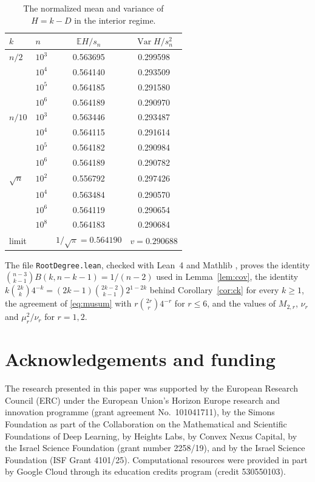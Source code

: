 \documentclass[11pt]{amsart}
\theoremstyle{remark}
\numberwithin{equation}{section}
\newcommand{\E}{\mathbb E}
\newcommand{\1}{\mathbf 1}
\newcommand{\Var}{\operatorname{Var}}
\begin{document}
\begin{table}[ht]
\centering
\begin{tabular}{llcc}
\toprule
$k$ & $n$ & $\E H/s_n$ & $\Var H/s_n^2$\\
\midrule
$n/2$ & $10^3$ & 0.563695 & 0.299598\\
 & $10^4$ & 0.564140 & 0.293509\\
 & $10^5$ & 0.564185 & 0.291580\\
 & $10^6$ & 0.564189 & 0.290970\\
\midrule
$n/10$ & $10^3$ & 0.563446 & 0.293487\\
 & $10^4$ & 0.564115 & 0.291614\\
 & $10^5$ & 0.564182 & 0.290984\\
 & $10^6$ & 0.564189 & 0.290782\\
\midrule
$\sqrt n$ & $10^2$ & 0.556792 & 0.297426\\
 & $10^4$ & 0.563484 & 0.290570\\
 & $10^6$ & 0.564119 & 0.290654\\
 & $10^8$ & 0.564183 & 0.290684\\
\midrule
limit & & $1/\sqrt\pi=0.564190$ & $v=0.290688$\\
\bottomrule
\end{tabular}
\caption{The normalized mean and variance of $H=k-D$ in the interior regime.}\label{tab:interior}
\end{table}

The file \texttt{RootDegree.lean}, checked with Lean~4 \cite{MU21} and Mathlib \cite{Mathlib20}, proves the identity $\binom{n-3}{k-1}B(k,n-k-1)=1/(n-2)$ used in Lemma~\ref{lem:cov}, the identity $k\binom{2k}k4^{-k}=(2k-1)\binom{2k-2}{k-1}2^{1-2k}$ behind Corollary~\ref{cor:ck} for every $k\ge1$, the agreement of \eqref{eq:musum} with $r\binom{2r}r4^{-r}$ for $r\le6$, and the values of $M_{2,r}$, $\nu_r$ and $\mu_r^2/\nu_r$ for $r=1,2$.

\section*{Acknowledgements and funding}
The research presented in this paper was supported by the European Research
Council (ERC) under the European Union's Horizon Europe research and
innovation programme (grant agreement No.~101041711), by the Simons
Foundation as part of the Collaboration on the Mathematical and Scientific
Foundations of Deep Learning, by Heights Labs, by Convex Nexus Capital, by
the Israel Science Foundation (grant number 2258/19), and by the Israel
Science Foundation (ISF Grant 4101/25). Computational resources were
provided in part by Google Cloud through its education credits program
(credit 530550103).
\end{document}
